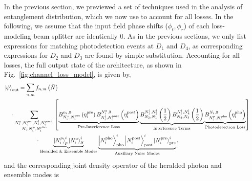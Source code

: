 \documentclass[aps,twocolumn,secnumarabic,amsmath,amssymb,pra,groupedaddress,
showpacs, showkeys]{revtex4-1}
\newcommand{\ket}[1]{\left|#1\right\rangle}
\newcommand{\pna}[1]{\left(#1\right)}
\newcommand{\pnb}[1]{\left[#1\right]}
\begin{document}
In the previous section, we previewed a set of techniques used in the analysis
of entanglement distribution, which we now use to account for all losses. In
the following, we assume that the input field phase shifts ($\phi_t,\phi_r$) of
each loss-modeling beam splitter are identically 0. As in the previous
sections, we only list expressions for matching photodetection events at $D_1$
and $D_4$, as corresponding expressions for $D_2$ and $D_3$ are found by simple
substitution. Accounting for all losses, the full output state of the
architecture, as shown in Fig.~\ref{fig:channel_loss_model}, is given by,
\begin{align}
\ket{\psi}_{\textrm{out}} & = \sum_{n,m} f_{n,m}\pna{\bar{N}} \nonumber \\
& \hspace{-5mm}\cdot
\sum_{\substack{N_i^a,N_i^{\textrm{pre}},N_i^l,N_i^{\textrm{post}},\\ N_i,N_i^p,N_i^{\textrm{pho}} }}
\pnb{\underbrace{B_{N_i^a,N_i^{\textrm{pre}}}^{n_i,0}\pna{\eta_i^{\textrm{pre}}}  
B_{N_i^l,N_i^{\textrm{post}}}^{N_i^a,0}\pna{\eta_i^{\textrm{post}}}}_\text{Pre-Interference Loss}
\underbrace{B_{N_2,N_1}^{N_1^l,N_2^l}\pna{\frac{1}{2}} B_{N_4,N_3}^{N_3^l,N_4^l}\pna{\frac{1}{2}}}_\text{Interference Terms}
\underbrace{B_{N_i^p,N_i^{\textrm{pho}}}^{N_i,0}\pna{\eta_i^{\textrm{pho}}}}_\text{Photodetection Loss}}   \nonumber \\
& \qquad \quad \cdot \underbrace{\ket{N_i^p}_{p}^i \ket{N_i^a}_{S}^i}_\text{Heralded \& Ensemble Modes} \underbrace{\ket{N_i^{\textrm{pho}}}_{\textrm{pho}}^i \ket{N_i^{\textrm{post}}}_{\textrm{post}}^i \ket{N_i^{\textrm{pre}}}_{\textrm{pre}}^i}_\text{Auxiliary Noise Modes}. 
\end{align}
and the corresponding joint density operator of the heralded photon and
ensemble modes is 
\end{document}
